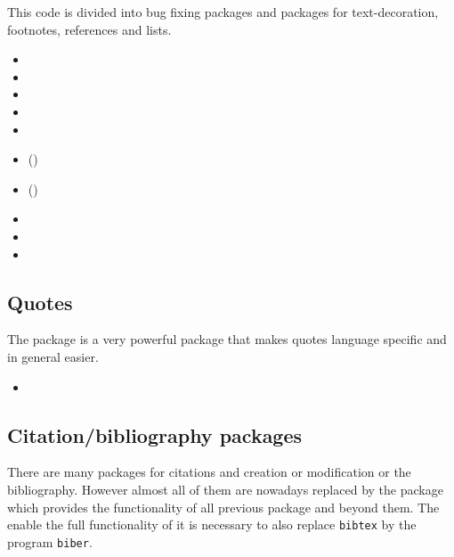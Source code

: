 This code is divided into bug fixing packages and packages for text-decoration, footnotes, references and lists.

\begin{itemize}[noitemsep]
\item {}
\item {}
\item {}
\item {}
\item {}
\item ()
\item ()
\item {}
\item {}
\item {}
\end{itemize}


\subsection{Quotes}

The package  is a very powerful package that makes quotes language specific and in general easier.

\begin{itemize}[noitemsep]
\item {}
\end{itemize}


\subsection{Citation/bibliography packages}

There are many packages for citations and creation or modification or the bibliography. However almost all of them are nowadays replaced by the package 
 which provides the functionality of all previous package and beyond them. The enable the full functionality of  it is necessary to also replace \texttt{bibtex} by the program \texttt{biber}.

